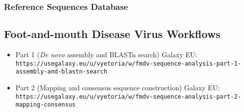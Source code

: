 \subsubsection*{\thesubsubsection \quad Reference Sequences Database}\label{sec:apx-aiv-refs}
\todoit

\subsection*{\thesubsection \quad Foot-and-mouth Disease Virus Workflows}\label{sec:apx-fmdv-links}

\begin{itemize}
	\setlength{\itemsep}{-0.4cm}
	\item Part 1 (\textit{De novo} assembly and BLASTn search) Galaxy EU:\\
	\texttt{https://usegalaxy.eu/u/vyetoria/w/fmdv-sequence-analysis-part-1-\\assembly-and-blastn-search}
	\item Part 2 (Mapping and consensus sequence construction) Galaxy EU:\\
	\texttt{https://usegalaxy.eu/u/vyetoria/w/fmdv-sequence-analysis-part-2-\\mapping-consensus}
\end{itemize}
